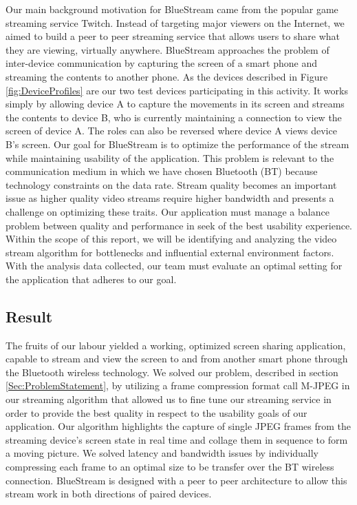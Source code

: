 \documentclass[a4paper,12pt]{article}
\begin{document}
Our main background motivation for BlueStream came from the popular game streaming service Twitch. Instead of targeting major viewers on the Internet, we aimed to build a peer to peer streaming service that allows users to share what they are viewing, virtually anywhere. BlueStream approaches the problem of inter-device communication by capturing the screen of a smart phone and streaming the contents to another phone. As the devices described in Figure \ref{fig:DeviceProfiles} are our two test devices participating in this activity. It works simply by allowing device A to capture the movements in its screen and streams the contents to device B, who is currently maintaining a connection to view the screen of device A. The roles can also be reversed where device A views device B’s screen. Our goal for BlueStream is to optimize the performance of the stream while maintaining usability of the application. This problem is relevant to the communication medium in which we have chosen Bluetooth (BT) because technology constraints on the data rate. Stream quality becomes an important issue as higher quality video streams require higher bandwidth and presents a challenge on optimizing these traits. Our application must manage a balance problem between quality and performance in seek of the best usability experience. Within the scope of this report, we will be identifying and analyzing the video stream algorithm for bottlenecks and influential external environment factors. With the analysis data collected, our team must evaluate an optimal setting for the application that adheres to our goal.  

\subsection{Result}
The fruits of our labour yielded a working, optimized screen sharing application, capable to stream and view the screen to and from another smart phone through the Bluetooth wireless technology. We solved our problem, described in section \ref{Sec:ProblemStatement}, by utilizing a frame compression format call M-JPEG in our streaming algorithm that allowed us to fine tune our streaming service in order to provide the best quality in respect to the usability goals of our application. Our algorithm highlights the capture of single JPEG frames from the streaming device’s screen state in real time and collage them in sequence to form a moving picture. We solved latency and bandwidth issues by individually compressing each frame to an optimal size to be transfer over the BT wireless connection. BlueStream is designed with a peer to peer architecture to allow this stream work in both directions of paired devices. 
\end{document}
